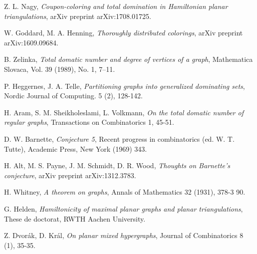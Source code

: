 \begin{thebibliography}{9}

Z. L. Nagy,
\textit{Coupon-coloring and total domination in Hamiltonian planar triangulations},
arXiv preprint arXiv:1708.01725.

W. Goddard, M. A. Henning,
\textit{Thoroughly distributed colorings},
arXiv preprint arXiv:1609.09684.

B. Zelinka,
\textit{Total domatic number and degree of vertices of a graph},
Mathematica Slovaca, Vol. 39 (1989), No. 1, 7--11.

P. Heggernes, J. A. Telle,
\textit{Partitioning graphs into generalized dominating sets},
Nordic Journal of Computing. 5 (2), 128-142.

H. Aram, S. M. Sheikholeslami, L. Volkmann,
\textit{On the total domatic number of regular graphs},
Transactions on Combinatorics 1, 45-51.

D. W. Barnette,
\textit{Conjecture 5},
Recent progress in combinatorics (ed. W. T. Tutte), Academic Press, New York (1969) 343.

H. Alt, M. S. Payne, J. M. Schmidt, D. R. Wood,
\textit{Thoughts on Barnette's conjecture},
arXiv preprint arXiv:1312.3783.

H. Whitney,
\textit{A theorem on graphs},
Annals of Mathematics 32 (1931), 378-3 90.

G. Helden,
\textit{Hamiltonicity of maximal planar graphs and planar triangulations},
These de doctorat, RWTH Aachen University.

Z. Dvorák, D. Král,
\textit{On planar mixed hypergraphs},
Journal of Combinatorics 8 (1), 35-35.

\end{thebibliography}

